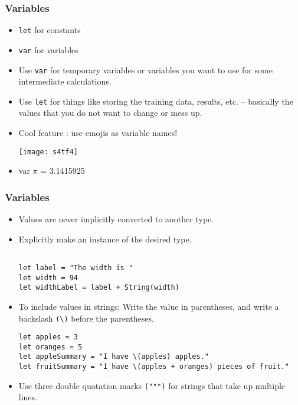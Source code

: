 \begin{frame}[fragile] \frametitle{Variables}

\begin{itemize}
\item \lstinline|let| for constants
\item \lstinline|var| for variables
\item Use \lstinline|var| for temporary variables or variables you want to use for some intermediate calculations.
\item Use \lstinline|let| for things like storing the training data, results, etc. – basically the values that you do not want to change or mess up.
\item Cool feature : use emojis as variable names!

\begin{center}
\texttt{[image: s4tf4]}
\end{center}

\item var $\pi$ = 3.1415925

\end{itemize}

\end{frame}

\begin{frame}[fragile] \frametitle{Variables}

\begin{itemize}
\item Values are never implicitly converted to another type.
\item Explicitly make an instance of the desired type.
\begin{lstlisting}[basicstyle=\scriptsize]

let label = "The width is "
let width = 94
let widthLabel = label + String(width)
\end{lstlisting}
\item To include values in strings: Write the value in parentheses, and write a backslash \lstinline|(\)| before the parentheses.
\begin{lstlisting}[basicstyle=\scriptsize]
let apples = 3
let oranges = 5
let appleSummary = "I have \(apples) apples."
let fruitSummary = "I have \(apples + oranges) pieces of fruit."
\end{lstlisting}
\item Use three double quotation marks \lstinline|(""")| for strings that take up multiple lines.
\end{itemize}


\end{frame}

